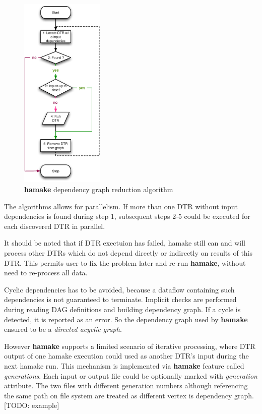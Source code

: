 \documentclass[10pt,conference,letterpaper]{IEEEtran}
\begin{document}
\begin{figure}[htp]
\centering
\includegraphics[width=4cm]{GraphReduction.eps}
\caption{\textbf{hamake} dependency graph reduction algorithm}
\label{fig:grred}
\end{figure}

The algorithms allows for parallelism. If more than one DTR without
input dependencies is found during step 1, subsequent steps 2-5 could
be executed for each discovered DTR in parallel.

It should be noted that if DTR exectuion has failed, hamake still can
and will process other DTRs which do not depend directly or indirectly
on results of this DTR. This permits user to fix the problem later and
re-run \textbf{hamake}, without need to re-process all data.

Cyclic dependencies has to be avoided, because a dataflow containing
such dependencies is not guaranteed to terminate. Implicit checks are
performed during reading DAG definitions and building dependency
graph. If a cycle is detected, it is reported as an error. So the
dependency graph used by \textbf{hamake} ensured to be a
\textit{directed acyclic graph}.

However \textbf{hamake} supports a limited scenario of iterative
processing, where DTR output of one hamake execution could used as
another DTR's input during the next hamake run. This mechanism is
implemented via \textbf{hamake} feature called
\textit{generations}. Each input or output file could be optionally
marked with \emph{generation} attribute. The two files with different
generation numbers although referencing the same path on file system
are treated as different vertex is dependency graph. [TODO: example]
\end{document}
